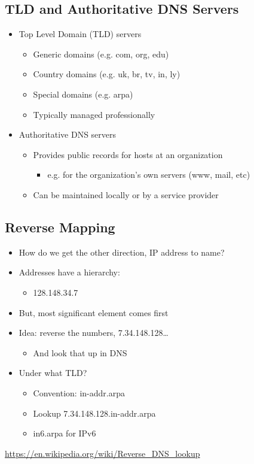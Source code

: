 \subsection{TLD and Authoritative DNS Servers}
\begin{itemize}[nosep]
    \item Top Level Domain (TLD) servers
          \begin{itemize}[nosep]
              \item Generic domains (e.g. com, org, edu)
              \item Country domains (e.g. uk, br, tv, in, ly)
              \item Special domains (e.g. arpa)
              \item Typically managed professionally
          \end{itemize}
    \item Authoritative DNS servers
          \begin{itemize}[nosep]
              \item Provides public records for hosts at an organization
                    \begin{itemize}[nosep]
                        \item e.g. for the organization's own servers (www, mail, etc)
                    \end{itemize}
              \item Can be maintained locally or by a service provider
          \end{itemize}
\end{itemize}
\subsection{Reverse Mapping}
\begin{itemize}[nosep]
    \item How do we get the other direction, IP address to name?
    \item Addresses have a hierarchy:
          \begin{itemize}[nosep]
              \item 128.148.34.7
          \end{itemize}
    \item But, most significant element comes first
    \item Idea: reverse the numbers, 7.34.148.128\dots
          \begin{itemize}[nosep]
              \item And look that up in DNS
          \end{itemize}
    \item Under what TLD?
          \begin{itemize}[nosep]
              \item Convention: in-addr.arpa
              \item Lookup 7.34.148.128.in-addr.arpa
              \item in6.arpa for IPv6
          \end{itemize}
\end{itemize}
\url{https://en.wikipedia.org/wiki/Reverse_DNS_lookup}
